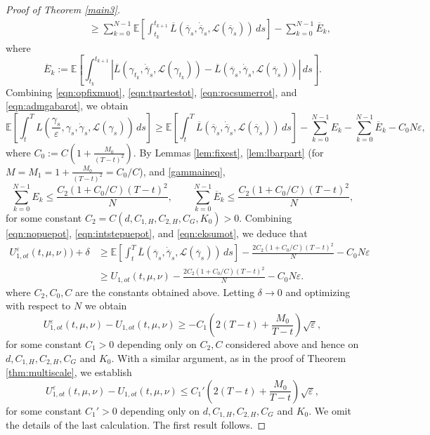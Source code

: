\documentclass[reqno,11pt]{amsart}
\numberwithin{equation}{section}
\newcommand{\e}{\varepsilon}
\renewcommand{\bar}{\overline}
\begin{document}
\begin{proof}[Proof of Theorem \ref{main3}]
\begin{equation}
\begin{aligned}
 & \hspace{2cm}\geq\sum_{k=0}^{N-1}
\mathbb{E} \left[\int_{t_k}^{t_{k+1}}
\bar{L}\left(\bar{\gamma}_s,
\dot{\bar{\gamma}}_s,
\mathcal{L}\left(\bar{\gamma}_s\right)
\right)\,ds\right]-\sum_{k=0}^{N-1} \bar{E}_k,
\end{aligned}
\end{equation}
where
\[
\bar{E}_k:= \mathbb{E} \left[\int_{t_k}^{t_{k+1}}\left|
\bar{L}\left(\gamma_{t_k},
\dot{\bar{\gamma}}_s,
 \mathcal{L}(\gamma_{t_k})
\right)-
\bar{L}\left(\bar{\gamma}_s,
\dot{\bar{\gamma}}_s,
\mathcal{L}\left(\bar{\gamma}_s\right)
\right)\right|\,ds\right].
\]
Combining \eqref{eqn:opfixmuot}, \eqref{eqn:tpartestot}, \eqref{eqn:rocsumerrot}, and \eqref{eqn:admgabarot}, we obtain
\begin{equation}\label{eqn:intstepuepot}
    \mathbb{E}\left[\int_{t}^T L\left( \frac{\gamma_s}{\e}, \gamma_s, \dot{\gamma}_s, \mathcal{L}(\gamma_s) \right)\, ds \right] \geq \mathbb{E} \left[\int_t^T
\bar{L}\left(\bar{\gamma}_s,
\dot{\bar{\gamma}}_s,
\mathcal{L}\left(\bar{\gamma}_s\right)
\right)\,ds\right]-\sum_{k=0}^{N-1} E_k -\sum_{k=0}^{N-1} \bar{E}_k -C_0N \e,
\end{equation}
where $C_0:=C\left(1+\frac{M_0}{(T-t)^2}\right)$. By Lemmas \ref{lem:fixest}, \ref{lem:lbarpart} (for $M=M_1=1+\frac{M_0}{(T-t)^2}=C_0/C$), and \eqref{gammaineq},
\begin{equation}\label{eqn:eksumot}
\sum_{k=0}^{N-1}E_k \leq  \frac{C_2(1+C_0/C)(T-t)^2}{N}, \qquad
\sum_{k=0}^{N-1}\bar{E}_k\leq \frac{C_2(1+C_0/C)(T-t)^2}{N},
\end{equation}
for some constant $C_2=C(d,C_{1,H},C_{2,H},C_G, K_0)>0$. Combining \eqref{eqn:nopuepot}, \eqref{eqn:intstepuepot}, and \eqref{eqn:eksumot}, we deduce that
\[
\begin{aligned}
U^\e_{1,ot}(t,\mu,\nu))+\delta & \geq \mathbb{E} \left[\int_t^T
\bar{L}\left(\bar{\gamma}_s,
\dot{\bar{\gamma}}_s,
\mathcal{L}\left(\bar{\gamma}_s\right)
\right)\,ds\right] -\frac{2C_2(1+C_0/C)(T-t)^2}{N}-C_0N\e\\
& \geq U_{1,ot}(t,\mu,\nu) -\frac{2C_2(1+C_0/C)(T-t)^2}{N}-C_0N\e.
\end{aligned}
\]
where $C_2,C_0,C$ are the constants obtained above. Letting $\delta\to 0$ and optimizing with respect to $N$ we obtain
$$U^\e_{1,ot}(t,\mu,\nu)-U_{1,ot}(t,\mu,\nu)\ge -C_1
\left(2(T-t)+\frac{M_0}{T-t}  \right)\sqrt{\e},$$
for some constant $C_1>0$ depending only on $C_2,C$ considered above and hence on $d,C_{1,H},C_{2,H},C_G$ and $K_0$. With a similar argument, as in the proof of Theorem \ref{thm:multiscale}, we establish
$$U^\e_{1,ot}(t,\mu,\nu)-U_{1,ot}(t,\mu,\nu)\le C_1'
\left(2(T-t)+\frac{M_0}{T-t}  \right)\sqrt{\e},$$
for some constant $C_1'>0$ depending only on $d,C_{1,H},C_{2,H},C_G$ and $K_0$. We omit the details of the last calculation. The first result follows.
\vspace{2.5mm}


\end{proof}
\end{document}
